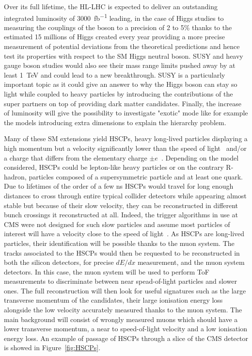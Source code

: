 	Over its full lifetime, the HL-LHC is expected to deliver an outstanding integrated luminosity of \SI{3000}{fb^{-1}} leading, in the case of Higgs studies to measuring the couplings of the boson to a precision of 2 to 5\% thanks to the estimated 15 millions of Higgs created every year providing a more precise measurement of potential deviations from the theoretical predictions and hence test its properties with respect to the SM Higgs neutral boson. SUSY and heavy gauge boson studies would also see their mass range limits pushed away by at least \SI{1}{TeV} and could lead to a new breakthrough. SUSY is a particularly important topic as it could give an answer to why the Higgs boson can stay so light while coupled to heavy particles by introducing the contributions of the super partners on top of providing dark matter candidates. Finally, the increase of luminosity will give the possibility to investigate "exotic" mode like for example the models introducing extra dimensions to explain the hierarchy problem.
	
	Many of these \acl{SM} extensions yield \acf{HSCPs}, heavy long-lived particles displaying a high momentum but a velocity significantly lower than the speed of light~\cite{DREES1990,FAIRBAIRN2007,LIGETI2010,KHACHATRYAN2017} and/or a charge that differs from the elementary charge $\pm e$~\cite{KHACHATRYAN2017,KUSENKO1998,KOCH2007,SCHWINGER1966,KHLOPOV2006}. Depending on the model considered, \acl{HSCPs} could be lepton-like heavy particles or on the contrary R-hadron, particles composed of a supersymmetric particle and at least one quark. Due to lifetimes of the order of a few \si{ns} HSCPs would travel for long enough distances to cross through entire typical collider detectors while appearing almost stable but because of their slow velocity, they can be reconstructed in different bunch crossings it reconstructed at all. Indeed, the trigger algorithms in use at CMS were not designed for such slow particles and assume most particles of interest will have a velocity close to the speed of light~\cite{KHACHATRYAN2017,KAZANA2009}. As HSCPs are long-lived particles, their identification will be possible thanks to the muon system. The tracks associated to the HSCPs would then be requested to be reconstructed in both the silicon detectors, for precise $dE/dx$ measurement, and the muon system detectors. In this case, the muon system will be used to perform \acf{ToF} measurements to discriminate between near spead-of-light particles and slower ones. The full reconstruction will then look for useful signatures such as the large transverse momentum of the candidates, their large ionisation energy loss alongside the low velocity accurately measured thanks to the muon system. The main background will consist of wrongly measured muons which should have a lower transverse momentum, a near to speed-of-light velocity and a low ionisation energy loss. An example of passage of HSCPs through a slice of the CMS detector is showed in Figure~\ref{fig:HSCPs}.
	
